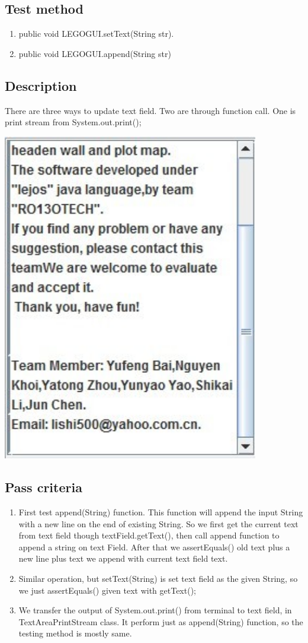 \documentclass[11pt, a4paper]{report}
\begin{document}
\subsection{Test method}
\begin{enumerate}
\item public void LEGOGUI.setText(String str). 
\item public void LEGOGUI.append(String str)
\end{enumerate}
\subsection{Description}
There are three ways to update text field. Two are through function call. One is print stream from System.out.print();
\begin{center}
  \includegraphics[width=11.20cm]{LogDisplay}
\end{center}
\subsection{Pass criteria}
\begin{enumerate}
\item First test append(String) function. This function will append the input String with a new line on the end of existing String. So we first get the current text from text field though textField.getText(), then call append function to append a string on text Field. After that we assertEquals() old text plus a new line plus text we append with current text field text. 
\item Similar operation, but setText(String) is set text field as the given String, so we just assertEquals() given text with getText();
\item We transfer the output of System.out.print() from terminal to text field, in TextAreaPrintStream class. It perform just as append(String) function, so the testing method is mostly same.
\end{enumerate}
\end{document}
